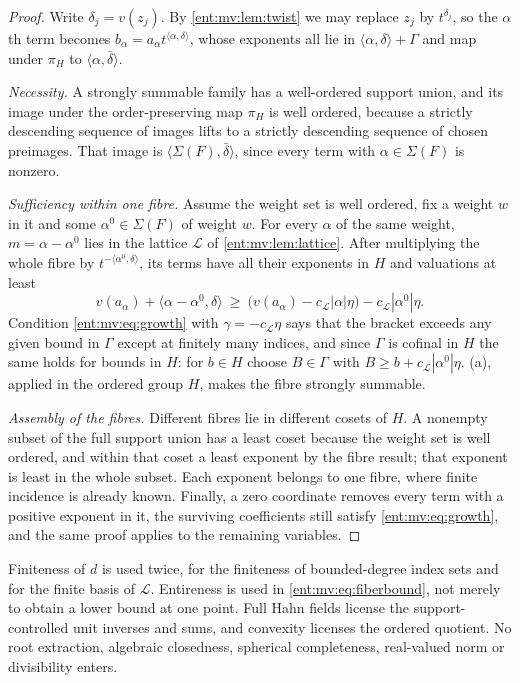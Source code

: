 \documentclass[11pt]{article}
\theoremstyle{plain}
\theoremstyle{plain}
\theoremstyle{plain}
\theoremstyle{definition}
\theoremstyle{definition}
\theoremstyle{definition}
\theoremstyle{definition}
\theoremstyle{remark}
\newcommand{\inner}[2]{\langle#1,#2\rangle}
\begin{document}
\begin{proof}
Write $\delta_j=v(z_j)$. By \cref{ent:mv:lem:twist} we may replace $z_j$ by
$t^{\delta_j}$, so the $\alpha$th term becomes
$b_\alpha=a_\alpha t^{\inner\alpha\delta}$, whose exponents all lie in
$\inner\alpha\delta+\Gamma$ and map under $\pi_H$ to $\inner\alpha{\bar\delta}$.

\emph{Necessity.} A strongly summable family has a well-ordered support
union, and its image under the order-preserving map $\pi_H$ is well ordered,
because a strictly descending sequence of images lifts to a strictly
descending sequence of chosen preimages. That image is
$\inner{\Sigma(F)}{\bar\delta}$, since every term with $\alpha\in\Sigma(F)$ is
nonzero.

\emph{Sufficiency within one fibre.} Assume the weight set is well ordered,
fix a weight $w$ in it and some $\alpha^0\in\Sigma(F)$ of weight $w$. For every
$\alpha$ of the same weight, $m=\alpha-\alpha^0$ lies in the lattice
$\mathcal L$ of \cref{ent:mv:lem:lattice}. After multiplying the whole fibre
by $t^{-\inner{\alpha^0}\delta}$, its terms have all their exponents in $H$
and valuations at least
\begin{equation}\label{ent:mv:eq:fiberbound}
 v(a_\alpha)+\inner{\alpha-\alpha^0}\delta
 \ \ge\ \bigl(v(a_\alpha)-c_{\mathcal L}|\alpha|\eta\bigr)
        -c_{\mathcal L}|\alpha^0|\eta .
\end{equation}
Condition \eqref{ent:mv:eq:growth} with $\gamma=-c_{\mathcal L}\eta$ says
that the bracket exceeds any given bound in $\Gamma$ except at finitely many
indices, and since $\Gamma$ is cofinal in $H$ the same holds for bounds in
$H$: for $b\in H$ choose $B\in\Gamma$ with $B\ge b+c_{\mathcal L}|\alpha^0|\eta$.
(a), applied in the ordered group $H$, makes the fibre
strongly summable.

\emph{Assembly of the fibres.} Different fibres lie in different cosets of
$H$. A nonempty subset of the full support union has a least coset because
the weight set is well ordered, and within that coset a least exponent by the
fibre result; that exponent is least in the whole subset. Each exponent
belongs to one fibre, where finite incidence is already known. Finally, a
zero coordinate removes every term with a positive exponent in it, the
surviving coefficients still satisfy \eqref{ent:mv:eq:growth}, and the same
proof applies to the remaining variables.
\end{proof}

Finiteness of $d$ is used twice, for the finiteness of bounded-degree index
sets and for the finite basis of $\mathcal L$. Entireness is used in
\eqref{ent:mv:eq:fiberbound}, not merely to obtain a lower bound at one
point. Full Hahn fields license the support-controlled unit inverses and
sums, and convexity licenses the ordered quotient. No root extraction,
algebraic closedness, spherical completeness, real-valued norm or
divisibility enters.
\end{document}
